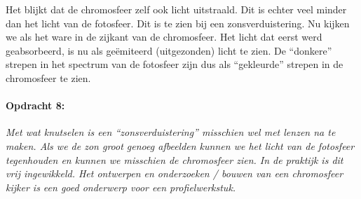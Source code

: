 Het blijkt dat de chromosfeer zelf ook licht uitstraald. Dit is echter
veel minder dan het licht van de fotosfeer. Dit is te zien bij een
zonsverduistering. Nu kijken we als het ware in de zijkant van de
chromosfeer. Het licht dat eerst werd geabsorbeerd, is nu als geëmiteerd
(uitgezonden) licht te zien. De ``donkere'' strepen in het spectrum
van de fotosfeer zijn dus als ``gekleurde'' strepen in de chromosfeer
te zien.


\paragraph*{Opdracht 8:}

\emph{Met wat knutselen is een ``zonsverduistering'' misschien wel
met lenzen na te maken. Als we de zon groot genoeg afbeelden kunnen
we het licht van de fotosfeer tegenhouden en kunnen we misschien de
chromosfeer zien. In de praktijk is dit vrij ingewikkeld. Het ontwerpen
en onderzoeken / bouwen van een chromosfeer kijker is een goed onderwerp
voor een profielwerkstuk.}


